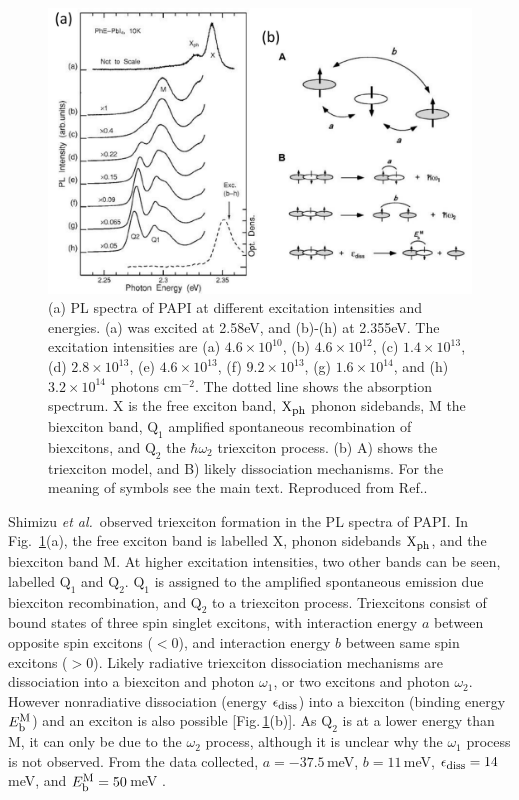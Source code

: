 \begin{figure}[h!]
\centering
\includegraphics[width=\textwidth]{Fig16}
\caption{(a) PL spectra of PAPI at different excitation intensities and energies. (a) was excited at 2.58eV, and (b)-(h) at 2.355eV. The excitation intensities are (a) $4.6\times 10^{10}$, (b) $4.6\times 10^{12}$, (c) $1.4\times 10^{13}$, (d) $2.8\times 10^{13}$, (e) $4.6\times 10^{13}$, (f) $9.2\times 10^{13}$, (g) $1.6\times 10^{14}$, and (h) $3.2\times 10^{14}$ photons c$\textrm{m}^{-2}$. The dotted line shows the absorption spectrum. X is the free exciton band, $\textrm{X}_{\textrm{\footnotesize ph}}$ phonon sidebands, M the biexciton band, $\textrm{Q}_1$ amplified spontaneous recombination of biexcitons, and $\textrm{Q}_2$ the $\hbar \omega_2$ triexciton process. (b) A) shows the triexciton model, and B) likely dissociation mechanisms. For the meaning of symbols see the main text. Reproduced from Ref.\cite{Shimizu2006a}.}
\label{2Fig16}
\end{figure}

Shimizu \textit{et al.}\ observed triexciton formation in the PL spectra of PAPI. In Fig.\ \ref{2Fig16}(a), the free exciton band is labelled X, phonon sidebands $\textrm{X}_{\textrm{\footnotesize ph}}$, and the biexciton band M. At higher excitation intensities, two other bands can be seen, labelled $\textrm{Q}_1$ and $\textrm{Q}_2$. $\textrm{Q}_1$ is assigned to the amplified spontaneous emission due biexciton recombination, and $\textrm{Q}_2$ to a triexciton process. Triexcitons consist of bound states of three spin singlet excitons, with interaction energy $a$ between opposite spin excitons ($<0$), and interaction energy $b$ between same spin excitons ($>0$). Likely radiative triexciton dissociation mechanisms are dissociation into a biexciton and photon $\omega_1$, or two excitons and photon $\omega_2$. However nonradiative dissociation (energy $\epsilon_{\textrm{\footnotesize diss}}$) into a biexciton (binding energy $E_{\textrm{\footnotesize b}}^{\textrm{\footnotesize M}}$) and an exciton is also possible [Fig.\,\ref{2Fig16}(b)]. As $\textrm{Q}_2$ is at a lower energy than M, it can only be due to the $\omega_2$ process, although it is unclear why the $\omega_1$ process is not observed. From the data collected, $a=-37.5$\,meV, $b=11$\,meV, $\epsilon_{\textrm{\footnotesize diss}}=14$\,meV, and $E_{\textrm{\footnotesize b}}^{\textrm{\footnotesize M}}=50$\,meV \cite{Shimizu2006a}. 



